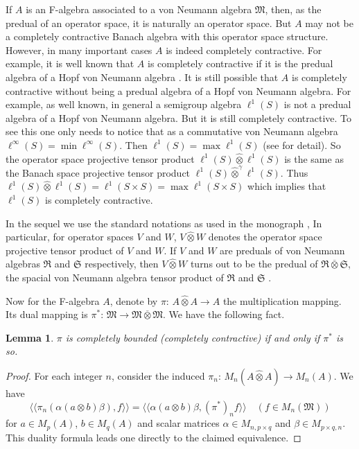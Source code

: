 \documentclass{tran-l}
\numberwithin{equation}{section}
\newtheorem{lemma}[thm]{Lemma}
\theoremstyle{definition}
\theoremstyle{remark}
\begin{document}
If $A$ is an F-algebra associated to a von Neumann algebra ${\mathfrak{M}}$, then, as the predual of an operator space, it is naturally an operator space. But $A$ may not be a completely contractive Banach algebra with this operator space structure. However, in many important cases $A$ is indeed completely contractive. For example, it is well known that $A$ is completely contractive if it is the predual algebra of a Hopf von Neumann algebra \cite{Ruan}. It is still possible that $A$ is  completely contractive without being a predual algebra of a Hopf von Neumann algebra. For example, as well known, in general a semigroup algebra $\ell^1(S)$ is not a predual algebra of a Hopf von Neumann algebra. But it is still completely contractive. To see this one only needs to notice that as a commutative von Neumann algebra $\ell^\infty(S) = \min  \ell^\infty(S)$. Then $\ell^1(S) = \max \ell^1(S)$ (see \cite[Section~3.3]{E-R} for detail). So the operator space projective tensor product $\ell^1(S) {\hat{\otimes}} \ell^1(S)$ is the same as the Banach space projective tensor product  $\ell^1(S) {\hat{\otimes}}^\gamma \ell^1(S)$. Thus $\ell^1(S) {\hat{\otimes}} \ell^1(S) = \ell^1(S\times S) = \max \ell^1(S\times S)$ which implies that $\ell^1(S)$ is completely contractive. 

In the sequel we use the standard notations as used in the monograph \cite{E-R}, In particular, for operator spaces $V$ and $W$,  $V{\hat{\otimes}} W$  denotes the operator space projective tensor product of $V$ and $W$. If $V$ and $W$ are preduals of von Neumann algebras ${\mathfrak{R}}$ and ${\mathfrak{S}}$ respectively, then $V{\hat{\otimes}} W$ turns out to be the predual of ${\mathfrak{R}} \overline\otimes {\mathfrak{S}}$, the spacial von Neumann algebra tensor product of ${\mathfrak{R}}$ and ${\mathfrak{S}}$ \cite[Theorem~7.2.4]{E-R}. 

Now for the F-algebra $A$, denote by $\pi$: $A{\hat{\otimes}} A \to A$ the multiplication mapping. Its dual mapping is $\pi^*$: ${\mathfrak{M}} \to {\mathfrak{M}} \overline\otimes {\mathfrak{M}}$. We have the following fact.

\begin{lemma}
$\pi$ is completely bounded (completely contractive) if and only if $\pi^*$ is so.
\end{lemma}

\begin{proof}
For each integer $n$, consider the induced $\pi_n$: $M_n(A{\hat{\otimes}} A) \to M_n(A)$. We have
\[
{\langle}{\langle} \pi_n({\alpha}(a\otimes b)\beta), f {\rangle}{\rangle} = {\langle}{\langle} {\alpha}(a\otimes b)\beta, (\pi^*)_n f {\rangle}{\rangle} \quad (f\in M_n({\mathfrak{M}}))
\]
for $a\in M_p(A)$, $b\in M_q(A)$ and scalar matrices ${\alpha}\in M_{n,p\times q}$ and $\beta\in M_{p\times q, n}$. This duality formula leads one directly to the claimed equivalence.
 
\end{proof}
\end{document}
